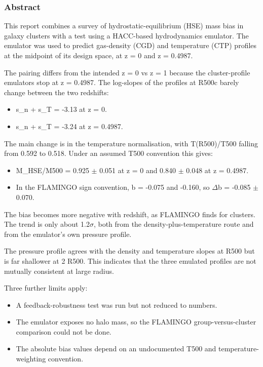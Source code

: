 \documentclass[11pt,a4paper]{article}
\begin{document}
\subsubsection*{Abstract}
This report combines a survey of hydrostatic-equilibrium (HSE) mass bias in galaxy clusters with a test using a HACC-based hydrodynamics emulator. The emulator was used to predict gas-density (CGD) and temperature (CTP) profiles at the midpoint of its design space, at z = 0 and z = 0.4987.

The pairing differs from the intended z = 0 vs z = 1 because the cluster-profile emulators stop at z = 0.4987. The log-slopes of the profiles at R500c barely change between the two redshifts:

\begin{itemize}
  \item s\_n + s\_T = -3.13 at z = 0.
  \item s\_n + s\_T = -3.24 at z = 0.4987.
\end{itemize}
The main change is in the temperature normalisation, with T(R500)/T500 falling from 0.592 to 0.518. Under an assumed T500 convention this gives:

\begin{itemize}
  \item M\_HSE/M500 = 0.925 $\pm$ 0.051 at z = 0 and 0.840 $\pm$ 0.048 at z = 0.4987.
  \item In the FLAMINGO sign convention, b = -0.075 and -0.160, so $\Delta$b = -0.085 $\pm$ 0.070.
\end{itemize}
The bias becomes more negative with redshift, as FLAMINGO finds for clusters. The trend is only about 1.2$\sigma$, both from the density-plus-temperature route and from the emulator's own pressure profile.

The pressure profile agrees with the density and temperature slopes at R500 but is far shallower at 2 R500. This indicates that the three emulated profiles are not mutually consistent at large radius.

Three further limits apply:

\begin{itemize}
  \item A feedback-robustness test was run but not reduced to numbers.
  \item The emulator exposes no halo mass, so the FLAMINGO group-versus-cluster comparison could not be done.
  \item The absolute bias values depend on an undocumented T500 and temperature-weighting convention.
\end{itemize}
\end{document}

